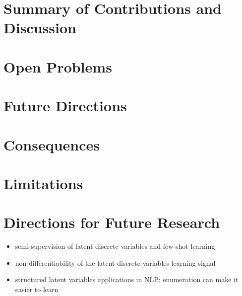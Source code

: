 \label{cap:conclusions}

\section{Summary of Contributions and Discussion}

\section{Open Problems}

\section{Future Directions}

\section{Consequences}

\section{Limitations}

\section{Directions for Future Research}

\begin{itemize}
    \item semi-supervision of latent discrete variables and few-shot learning
    \item non-differentiability of the latent discrete variables learning signal
    \item structured latent variables applications in NLP: enumeration can make it easier to learn
\end{itemize}

